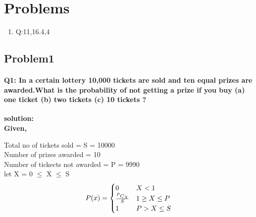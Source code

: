 \documentclass[10pt, a4paper]{article}
\title{\mytitle}
\author{\myauthor\hspace{1em}\\\contact\\FWC22088\hspace{6.5em}IITH\hspace{0.5em}\mymodule\hspace{6em}probability}
\newcommand*{\permcomb}[4][0mu]{{{}^{#3}\mkern#1#2_{#4}}}
\newcommand*{\comb}[1][-1mu]{\permcomb[#1]{C}}
\begin{document}
	\maketitle
\section{Problems}
\begin{enumerate}
\item Q:11,16.4,4
\end{enumerate}
\subsection{Problem1}
\paragraph{Q1: In a certain lottery 10,000 tickets are sold and ten equal prizes are awarded.What is the probability of not getting a prize if you buy (a) one ticket (b) two tickets (c) 10 tickets ?\\}	

\textbf{solution:}\\
\textbf{Given,}\\
\begin{center}
Total no of tickets sold = S = 10000\\
Number of prizes awarded = 10\\
Number of tickects not awarded = P = 9990\\
let X = 0 $\leq$ X $\leq$ S
\begin{equation*}
P(x) = 
\begin{cases}
0 & X < 1\\
\frac{\comb{P}{X}}{S} & 1 \geq X \leq P\\
1 &  P > X \leq S
\end{cases}
\end{equation*}
\end{center}
\end{document}
